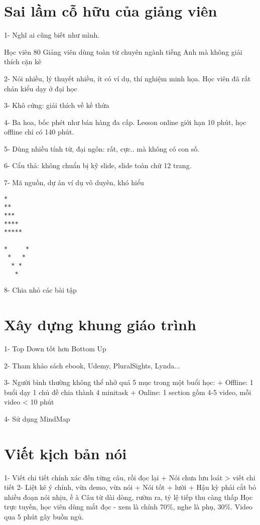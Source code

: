 \section{Sai lầm cỗ hữu của giảng viên}

1- Nghĩ ai cũng biết như mình.

Học viên 80%
Giảng viên dùng toàn từ chuyên ngành tiếng Anh mà không giải thích cặn kẽ

2- Nói nhiều, lý thuyết nhiều, ít có ví dụ, thí nghiệm minh họa. Học viên đã rất chán kiểu dạy ở đại học

3- Khô cứng: giải thích về kế thừa

4- Ba hoa, bốc phét như bán hàng đa cấp. Lesson online giới hạn 10 phút, học offline chỉ có 140 phút.

5- Dùng nhiều tính từ, đại ngôn: rất, cực.. mà không có con số.

6- Cẩu thả: không chuẩn bị kỹ slide, slide toàn chữ
12 trang.

7- Mã nguồn, dự án ví dụ vô duyên, khó hiểu

\begin{lstlisting}
*
**
***
****
*****

*     *
 *   *
  * *
   *
\end{lstlisting}

8- Chia nhỏ các bài tập

\section{Xây dựng khung giáo trình}

1- Top Down tốt hơn Bottom Up

2- Tham khảo sách ebook, Udemy, PluralSights, Lynda...

3- Người bình thường không thể nhớ quá 5 mục trong một buổi học:
+ Offline: 1 buổi dạy 1 chủ đề chia thành 4 minitask
+ Online: 1 section gồm 4-5 video, mỗi video < 10 phút

4- Sử dụng MindMap

\section{Viết kịch bản nói}

1- Viết chi tiết chính xác đến từng câu, rồi đọc lại
+ Nói chưa lưu loát > viết chi tiết
2- Liệt kê ý chính, vừa demo, vừa nói
+ Nói tốt + lười
+ Hậu kỳ phải cắt bỏ nhiều đoạn nói nhịu, ề à
Câu từ dài dòng, rườm ra, tỷ lệ tiếp thu càng thấp
Học trực tuyến, học viên dùng mắt đọc - xem là chính 70\%, nghe là phụ, 30\%. Video qua 5 phút gây buồn ngủ.

